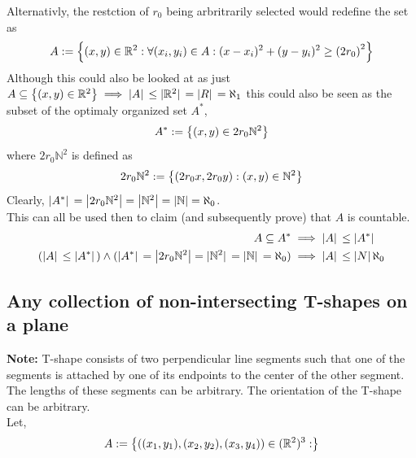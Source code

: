 \documentclass[]{article}
\newcommand{\R}{\mathbb{R}}
\newcommand{\N}{\mathbb{N}}
\begin{document}
Alternativly, the restction of $r_0$ being arbritrarily selected would redefine the set as
\begin{displaymath}
	A := \qty{(x,y) \in \R^2 : \forall (x_i,y_i) \in A : 
			(x - x_i)^2 + (y - y_i)^2 \geq \qty(2r_0)^2}
\end{displaymath}
Although this could also be looked at as just 
$A \subseteq \qty{(x,y) \in \R^2} \implies \abs*{A} \leq \abs*{\R^2} = \abs*{R} = \aleph_1$
this could also be seen as the subset of the optimaly organized set $A^*$,
\begin{displaymath}
	A^* := \qty{(x,y) \in 2 r_0 \N^2}
\end{displaymath}
where $2 r_0 \N^2$ is defined as
\begin{displaymath}
	2 r_0 \N^2 := \qty{(2 r_0 x, 2 r_0 y) : (x,y) \in \N^2}
\end{displaymath}
Clearly, $\abs*{A^*} = \abs{2 r_0 \N^2} = \abs{\N^2} = \abs{\N} = \aleph_0$.\\

This can all be used then to claim (and subsequently prove) that $A$ is countable.
\begin{align*}
	A \subseteq A^* &\implies \abs*{A} \leq \abs*{A^*}\\
	(\abs*{A} \leq \abs*{A^*}) \land (\abs*{A^*} = \abs{2 r_0 \N^2} = \abs*{\N^2} = \abs*{\N} = \aleph_0) 
		&\implies \abs*{A} \leq \abs*{N} \aleph_0	
\end{align*}


\subsection{Any collection of non-intersecting T-shapes on a plane}
\textbf{Note:} T-shape consists of two perpendicular line segments such that 
one of the segments is attached by one of its endpoints to the center of the other segment. 
The lengths of these segments can be arbitrary. The orientation of the T-shape can be arbitrary.\\

Let,
\begin{displaymath}
	A := \qty{((x_1,y_1),(x_2,y_2),(x_3,y_4)) \in (\R^2)^3 :}
\end{displaymath}


\end{document}
